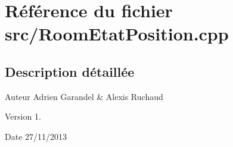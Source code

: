 \section{Référence du fichier src/\-Room\-Etat\-Position.cpp}
\label{_room_etat_position_8cpp}


\subsection{Description détaillée}
\begin{DoxyAuthor}{Auteur}
Adrien Garandel \& Alexis Ruchaud 
\end{DoxyAuthor}
\begin{DoxyVersion}{Version}
1. 
\end{DoxyVersion}
\begin{DoxyDate}{Date}
27/11/2013 
\end{DoxyDate}
